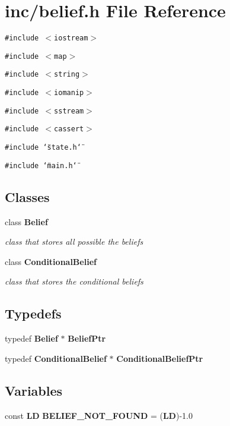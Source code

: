 \section{inc/belief.h File Reference}
\label{belief_8h}
{\tt \#include $<$iostream$>$}\par
{\tt \#include $<$map$>$}\par
{\tt \#include $<$string$>$}\par
{\tt \#include $<$iomanip$>$}\par
{\tt \#include $<$sstream$>$}\par
{\tt \#include $<$cassert$>$}\par
{\tt \#include \char`\"{}state.h\char`\"{}}\par
{\tt \#include \char`\"{}main.h\char`\"{}}\par
\subsection*{Classes}
\begin{CompactItemize}
\item 
class {\bf Belief}
\begin{CompactList}\small\item\em class that stores all possible the beliefs \item\end{CompactList}\item 
class {\bf ConditionalBelief}
\begin{CompactList}\small\item\em class that stores the conditional beliefs \item\end{CompactList}\end{CompactItemize}
\subsection*{Typedefs}
\begin{CompactItemize}
\item 
typedef {\bf Belief} $\ast$ {\bf BeliefPtr}
\item 
typedef {\bf ConditionalBelief} $\ast$ {\bf ConditionalBeliefPtr}
\end{CompactItemize}
\subsection*{Variables}
\begin{CompactItemize}
\item 
const {\bf LD} {\bf BELIEF\_\-NOT\_\-FOUND} = ({\bf LD})-1.0
\end{CompactItemize}


